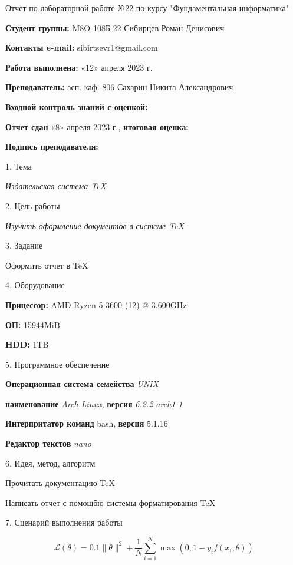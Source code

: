 \documentclass[12pt]{article}
\begin{document}
\Large Отчет по лабораторной работе №22 по курсу "Фундаментальная информатика"
\normalsize

{\bfseries Студент группы:} M8O-108Б-22 Сибирцев Роман Денисович

{\bfseries Контакты e-mail:} sibirtsevr1@gmail.com

{\bfseries Работа выполнена:} «12» апреля 2023 г. 

{\bfseries Преподаватель:} асп. каф. 806 Сахарин Никита Александрович

{\bfseries Входной контроль знаний с оценкой:}

{\bfseries Отчет сдан} «8» апреля 2023 г., {\bfseries итоговая оценка:}

{\bfseries Подпись преподавателя:} \underline{\hspace{3cm}}


{\Large 1. Тема}

{\itshape Издательская система \TeX}

{\Large 2. Цель работы}

{\itshape Изучить оформление документов в системе \TeX}

{\Large 3. Задание}

Оформить отчет в \TeX

{\Large 4. Оборудование}


{\bfseries Прицессор:} AMD Ryzen 5 3600 (12) @ 3.600GHz

{\bfseries ОП:} 15944MiB

{\bfseries HDD:} 1TB

{\Large 5. Программное обеспечение}


{\bfseries Операционная система семейства} {\itshape UNIX}

{\bfseries наименование} {\itshape Arch Linux}, {\bfseries версия} {\itshape 6.2.2-arch1-1} 

{\bfseries Интерпритатор команд} {bash}, {\bfseries версия} {5.1.16} 

{\bfseries Редактор текстов} {\itshape nano}

{\Large 6. Идея, метод, алгоритм}

Прочитать документацию \TeX

Написать отчет с помощбю системы форматирования \TeX


{\Large 7. Сценарий выполнения работы}

\begin{equation}
\mathcal{L}(\theta) = 0.1 \|\theta\|^2 + \frac{1}{N}\sum\limits_{i=1}^N \max(0, 1 - y_i f(x_i, \theta))
\end{equation}
\end{document}
